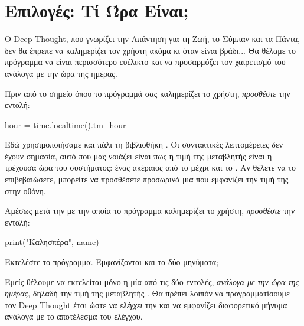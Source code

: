 \documentclass[a4paper,11pt,oneside]{book}
\begin{document}
\clearpage
\section{Επιλογές: Τί Ώρα Είναι;}

Ο Deep Thought, που γνωρίζει την Απάντηση για τη Ζωή, το Σύμπαν και τα Πάντα, δεν θα έπρεπε να καλημερίζει τον χρήστη ακόμα κι όταν είναι βράδι... Θα θέλαμε το πρόγραμμα να είναι περισσότερο ευέλικτο και να προσαρμόζει τον χαιρετισμό του ανάλογα με την ώρα της ημέρας.

\begin{step}
\label{step:hour-assign}
Πριν από το σημείο όπου το πρόγραμμά σας καλημερίζει το χρήστη, \emph{προσθέστε} την εντολή:

\begin{pynew}
hour = time.localtime().tm_hour
\end{pynew}

Εδώ χρησιμοποιήσαμε και πάλι τη βιβλιοθήκη . 
Οι συντακτικές λεπτομέρειες δεν έχουν σημασία, αυτό που μας νοιάζει είναι πως η τιμή της μεταβλητής  είναι η τρέχουσα ώρα του συστήματος: ένας ακέραιος από το  μέχρι και το . Αν θέλετε να το επιβεβαιώσετε, μπορείτε να προσθέσετε προσωρινά μια  που εμφανίζει την τιμή της  στην οθόνη.
\end{step}

\begin{step}
Αμέσως μετά την  με την οποία
το πρόγραμμα καλημερίζει το χρήστη, \emph{προσθέστε} την εντολή:%

\begin{pynew}
print("Καλησπέρα", name)
\end{pynew}

Εκτελέστε το πρόγραμμα. Εμφανίζονται και τα δύο μηνύματα;  

\marginnote[14pt]{\icondiscuss}
\dottedline

Εμείς θέλουμε να εκτελείται μόνο η μία από τις δύο εντολές, \emph{ανάλογα με την ώρα της ημέρας}, δηλαδή την τιμή της μεταβλητής . Θα πρέπει λοιπόν να προγραμματίσουμε τον Deep Thought έτσι ώστε να \emph{ελέγχει} την  και να εμφανίζει διαφορετικό μήνυμα ανάλογα με το αποτέλεσμα του ελέγχου. 
\end{step}
\end{document}
